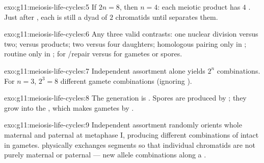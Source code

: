 \begin{solution}{exo:g11:meiosis-life-cycles:5}
If $2n = 8$, then $n = 4$: each meiotic product has $4$ . Just after
, each  is still a dyad of $2$ chromatids until 
separates them.
\end{solution}

\begin{solution}{exo:g11:meiosis-life-cycles:6}
Any three valid contrasts: one nuclear division versus two;  versus
 products; two versus four daughters; homologous pairing only in
; routine  only in ;  for /repair
versus  for gametes or spores.
\end{solution}

\begin{solution}{exo:g11:meiosis-life-cycles:7}
Independent assortment alone yields $2^{n}$ combinations. For $n = 3$,
$2^{3} = 8$ different gamete  combinations (ignoring ).
\end{solution}

\begin{solution}{exo:g11:meiosis-life-cycles:8}
The  generation is . Spores are produced by ; they
grow into the  , which makes gametes by .
\end{solution}

\begin{solution}{exo:g11:meiosis-life-cycles:9}
Independent assortment randomly orients whole maternal and paternal
 at metaphase I, producing different combinations of intact
 in gametes.  physically exchanges segments so that
individual chromatids are not purely maternal or paternal --- new allele
combinations along a .
\end{solution}

